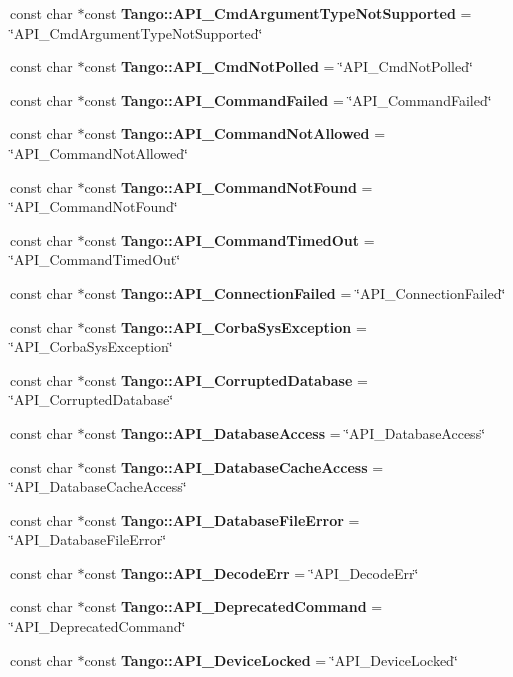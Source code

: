 \begin{DoxyCompactItemize}
\item 
const char $\ast$const {\bf Tango\-::\-A\-P\-I\-\_\-\-Cmd\-Argument\-Type\-Not\-Supported} = \char`\"{}A\-P\-I\-\_\-\-Cmd\-Argument\-Type\-Not\-Supported\char`\"{}
\item 
const char $\ast$const {\bf Tango\-::\-A\-P\-I\-\_\-\-Cmd\-Not\-Polled} = \char`\"{}A\-P\-I\-\_\-\-Cmd\-Not\-Polled\char`\"{}
\item 
const char $\ast$const {\bf Tango\-::\-A\-P\-I\-\_\-\-Command\-Failed} = \char`\"{}A\-P\-I\-\_\-\-Command\-Failed\char`\"{}
\item 
const char $\ast$const {\bf Tango\-::\-A\-P\-I\-\_\-\-Command\-Not\-Allowed} = \char`\"{}A\-P\-I\-\_\-\-Command\-Not\-Allowed\char`\"{}
\item 
const char $\ast$const {\bf Tango\-::\-A\-P\-I\-\_\-\-Command\-Not\-Found} = \char`\"{}A\-P\-I\-\_\-\-Command\-Not\-Found\char`\"{}
\item 
const char $\ast$const {\bf Tango\-::\-A\-P\-I\-\_\-\-Command\-Timed\-Out} = \char`\"{}A\-P\-I\-\_\-\-Command\-Timed\-Out\char`\"{}
\item 
const char $\ast$const {\bf Tango\-::\-A\-P\-I\-\_\-\-Connection\-Failed} = \char`\"{}A\-P\-I\-\_\-\-Connection\-Failed\char`\"{}
\item 
const char $\ast$const {\bf Tango\-::\-A\-P\-I\-\_\-\-Corba\-Sys\-Exception} = \char`\"{}A\-P\-I\-\_\-\-Corba\-Sys\-Exception\char`\"{}
\item 
const char $\ast$const {\bf Tango\-::\-A\-P\-I\-\_\-\-Corrupted\-Database} = \char`\"{}A\-P\-I\-\_\-\-Corrupted\-Database\char`\"{}
\item 
const char $\ast$const {\bf Tango\-::\-A\-P\-I\-\_\-\-Database\-Access} = \char`\"{}A\-P\-I\-\_\-\-Database\-Access\char`\"{}
\item 
const char $\ast$const {\bf Tango\-::\-A\-P\-I\-\_\-\-Database\-Cache\-Access} = \char`\"{}A\-P\-I\-\_\-\-Database\-Cache\-Access\char`\"{}
\item 
const char $\ast$const {\bf Tango\-::\-A\-P\-I\-\_\-\-Database\-File\-Error} = \char`\"{}A\-P\-I\-\_\-\-Database\-File\-Error\char`\"{}
\item 
const char $\ast$const {\bf Tango\-::\-A\-P\-I\-\_\-\-Decode\-Err} = \char`\"{}A\-P\-I\-\_\-\-Decode\-Err\char`\"{}
\item 
const char $\ast$const {\bf Tango\-::\-A\-P\-I\-\_\-\-Deprecated\-Command} = \char`\"{}A\-P\-I\-\_\-\-Deprecated\-Command\char`\"{}
\item 
const char $\ast$const {\bf Tango\-::\-A\-P\-I\-\_\-\-Device\-Locked} = \char`\"{}A\-P\-I\-\_\-\-Device\-Locked\char`\"{}

\end{DoxyCompactItemize}
